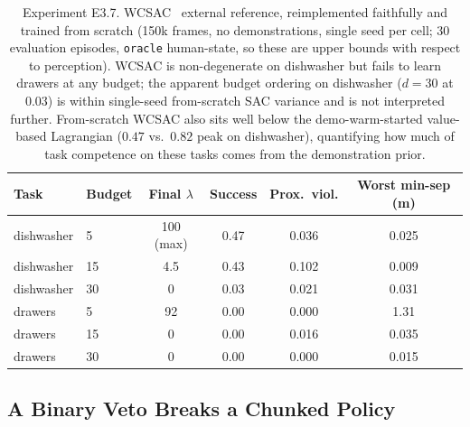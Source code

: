 \documentclass[11pt,a4paper]{report}
\begin{document}
\begin{table}[htbp]
\centering
\small
\caption{Experiment E3.7. WCSAC~\cite{yang2021wcsac} external
reference, reimplemented faithfully and trained from scratch (150k
frames, no demonstrations, single seed per cell; 30 evaluation
episodes, \texttt{oracle} human-state, so these are upper bounds with
respect to perception). WCSAC is non-degenerate on dishwasher but
fails to learn drawers at any budget; the apparent budget ordering on
dishwasher ($d{=}30$ at $0.03$) is within single-seed from-scratch
SAC variance and is not interpreted further. From-scratch WCSAC also
sits well below the demo-warm-started value-based Lagrangian
($0.47$ vs.\ $0.82$ peak on dishwasher), quantifying how much of
task competence on these tasks comes from the demonstration prior.}
\label{tab:e3.7-wcsac}
\begin{tabular}{llcccc}
\toprule
Task & Budget & Final $\lambda$ & Success & Prox.\ viol. & Worst min-sep (m) \\
\midrule
dishwasher & 5  & 100 (max) & 0.47 & 0.036 & 0.025 \\
dishwasher & 15 & 4.5       & 0.43 & 0.102 & 0.009 \\
dishwasher & 30 & 0         & 0.03 & 0.021 & 0.031 \\
drawers    & 5  & 92        & 0.00 & 0.000 & 1.31 \\
drawers    & 15 & 0         & 0.00 & 0.016 & 0.035 \\
drawers    & 30 & 0         & 0.00 & 0.000 & 0.015 \\
\bottomrule
\end{tabular}
\end{table}

\subsection{A Binary Veto Breaks a Chunked Policy}
\label{sec:results:r2-veto}
\end{document}
